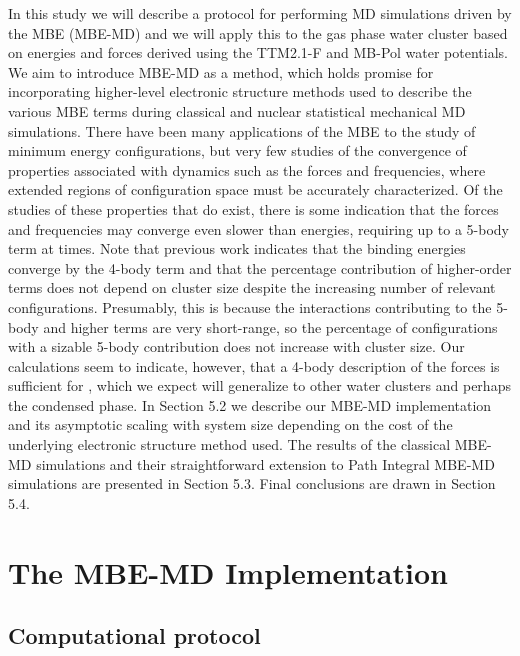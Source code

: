 \documentclass[11pt, proquest]{uwthesis}[2020/02/24]
\let\ce\ch
\begin{document}
\par In this study we will describe a protocol for performing MD simulations driven by the MBE (MBE-MD) and we will apply this to the gas phase \ce{(H2O)_{10}} water cluster based on energies and forces derived using the TTM2.1-F and MB-Pol water potentials. We aim to introduce MBE-MD as a method, which holds promise for incorporating higher-level electronic structure methods used to describe the various MBE terms during classical and nuclear statistical mechanical MD simulations. There have been many applications of the MBE to the study of minimum energy configurations,\autocite{dahlke_electrostatically_2007,richard_generalized_2012,cui_theoretical_2006} but very few studies of the convergence of properties associated with dynamics such as the forces and frequencies, where extended regions of configuration space must be accurately characterized. Of the studies of these properties that do exist, there is some indication that the forces and frequencies may converge even slower than energies, requiring up to a 5-body term at times.\autocite{demerdash_convergence_2016,demerdash_assessing_2017} Note that previous work indicates that the binding energies converge by the 4-body term and that the percentage contribution of higher-order terms does not depend on cluster size despite the increasing number of relevant configurations\autocite{heindel_many-body_2020}. Presumably, this is because the interactions contributing to the 5-body and higher terms are very short-range, so the percentage of configurations with a sizable 5-body contribution does not increase with cluster size. Our calculations seem to indicate, however, that a 4-body description of the forces is sufficient for \ce{(H2O)_{10}}, which we expect will generalize to other water clusters and perhaps the condensed phase. In Section 5.2 we describe our MBE-MD implementation and its asymptotic scaling with system size depending on the cost of the underlying electronic structure method used. The results of the classical MBE-MD simulations and their straightforward extension to Path Integral MBE-MD simulations are presented in Section 5.3. Final conclusions are drawn in Section 5.4.

\section{The MBE-MD Implementation}
\subsection{Computational protocol}
\end{document}
